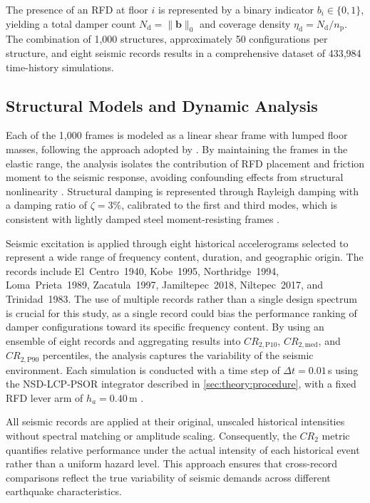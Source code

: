 \documentclass[preprint,12pt,authoryear]{elsarticle}
\newcommand{\CR}[1]{CR_{2,\text{#1}}}
\newcommand{\nd}{N_{\mathrm{d}}}
\newcommand{\np}{n_{\mathrm{p}}}
\newcommand{\etad}{\eta_{\mathrm{d}}}
\newcommand{\ha}{h_a}
\begin{document}
The presence of an RFD at floor $i$ is represented by a binary indicator $b_i \in \{0,1\}$, yielding a total damper count $\nd = \|\bm{b}\|_0$ and coverage density $\etad = \nd/\np$. The combination of 1,000 structures, approximately 50 configurations per structure, and eight seismic records results in a comprehensive dataset of 433,984 time-history simulations.

\subsection{Structural Models and Dynamic Analysis}
\label{sec:method:modelo}

Each of the 1,000 frames is modeled as a linear shear frame with lumped floor masses, following the approach adopted by \citet{Namorado2022}. By maintaining the frames in the elastic range, the analysis isolates the contribution of RFD placement and friction moment to the seismic response, avoiding confounding effects from structural nonlinearity \citep{chopra_dynamics_2015}. Structural damping is represented through Rayleigh damping with a damping ratio of $\zeta = 3\%$, calibrated to the first and third modes, which is consistent with lightly damped steel moment-resisting frames \citep{chopra_dynamics_2015}.

Seismic excitation is applied through eight historical accelerograms selected to represent a wide range of frequency content, duration, and geographic origin. The records include El~Centro~1940, Kobe~1995, Northridge~1994, Loma~Prieta~1989, Zacatula~1997, Jamiltepec~2018, Niltepec~2017, and Trinidad~1983. The use of multiple records rather than a single design spectrum is crucial for this study, as a single record could bias the performance ranking of damper configurations toward its specific frequency content. By using an ensemble of eight records and aggregating results into $\CR{P10}$, $\CR{med}$, and $\CR{P90}$ percentiles, the analysis captures the variability of the seismic environment. Each simulation is conducted with a time step of $\Delta t = 0.01$\,s using the NSD-LCP-PSOR integrator described in \cref{sec:theory:procedure}, with a fixed RFD lever arm of $\ha = 0.40$\,m \citep{Mualla2002, Jarrahi2020jbe}.

All seismic records are applied at their original, unscaled historical intensities without spectral matching or amplitude scaling. Consequently, the $CR_2$ metric quantifies relative performance under the actual intensity of each historical event rather than a uniform hazard level. This approach ensures that cross-record comparisons reflect the true variability of seismic demands across different earthquake characteristics.
\end{document}
